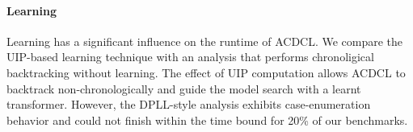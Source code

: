 \paragraph {\textbf{Learning}} Learning has a significant influence on
the runtime of ACDCL.  We compare the UIP-based learning technique with 
an analysis that performs chronoligical backtracking without learning. 
The effect of UIP computation allows ACDCL to backtrack non-chronologically 
and guide the model search with a learnt transformer.  However, the DPLL-style 
analysis exhibits case-enumeration behavior and could not finish within the time 
bound for 20\% of our benchmarks. 


